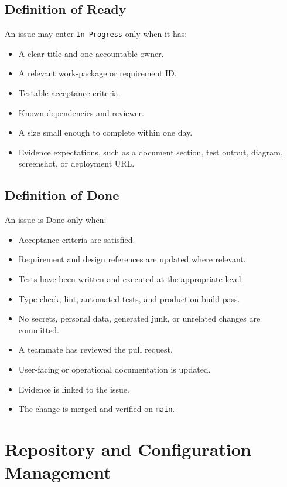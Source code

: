 \documentclass[
  10pt,
  a4paper,
  oneside]{report}
\providecommand{\tightlist}{%
  \setlength{\itemsep}{0pt}\setlength{\parskip}{0pt}}
\begin{document}
\section{Definition of Ready}\label{83-definition-of-ready}

An issue may enter \texttt{In\ Progress} only when it has:

\begin{itemize}
\tightlist
\item
  A clear title and one accountable owner.
\item
  A relevant work-package or requirement ID.
\item
  Testable acceptance criteria.
\item
  Known dependencies and reviewer.
\item
  A size small enough to complete within one day.
\item
  Evidence expectations, such as a document section, test output,
  diagram, screenshot, or deployment URL.
\end{itemize}

\section{Definition of Done}\label{84-definition-of-done}

An issue is Done only when:

\begin{itemize}
\tightlist
\item
  Acceptance criteria are satisfied.
\item
  Requirement and design references are updated where relevant.
\item
  Tests have been written and executed at the appropriate level.
\item
  Type check, lint, automated tests, and production build pass.
\item
  No secrets, personal data, generated junk, or unrelated changes are
  committed.
\item
  A teammate has reviewed the pull request.
\item
  User-facing or operational documentation is updated.
\item
  Evidence is linked to the issue.
\item
  The change is merged and verified on \texttt{main}.
\end{itemize}

\chapter{Repository and Configuration
Management}\label{9-repository-and-configuration-management}
\end{document}
